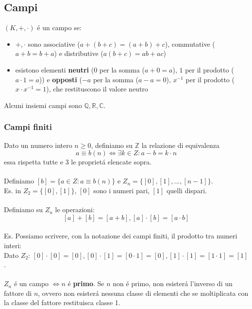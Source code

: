 \documentclass{article}
\begin{document}
\subsection{Campi}
$(K, +, \cdot)$ é un campo se:
\begin{itemize}
	\item[] $+, \cdot$ sono associative ($a+(b+c) = (a+b)+c$), commutative ($a+b=b+a$) e distributive ($a(b+c)=ab+ac$)
	\item[] esistono elementi \textbf{neutri} ($0$ per la somma ($a+0=a$), $1$ per il prodotto ($a \cdot 1 = a$)) e \textbf{opposti} ($-a$ per la somma ($a-a=0$), $x^{-1}$ per il prodotto ($x \cdot x^{-1} = 1$), che restituscono il valore neutro
\end{itemize}
Alcuni insiemi campi sono $\mathbb{Q}, \mathbb{R}, \mathbb{C}$.

\subsubsection{Campi finiti}
Dato un numero intero $n \ge 0$, definiamo su $\mathbb{Z}$ la relazione di equivalenza
$$a \equiv b (n) \iff \exists k \in Z : a - b = k \cdot n$$
essa rispetta tutte e 3 le proprietá elencate sopra. \\\\
Definiamo $[b] = \{a \in Z : a \equiv b (n)\}$ e $Z_n = \{[0], [1], ..., [n-1]\}$. \\
Es. in $Z_2 = \{[0], [1]\}$, $[0]$ sono i numeri pari, $[1]$ quelli dispari. \\\\
Definiamo su $Z_n$ le operazioni:\\
$$[a] + [b] = [a+b], [a] \cdot [b] = [a \cdot b]$$ \\
Es. Possiamo scrivere, con la notazione dei campi finiti, il prodotto tra numeri interi: \\
Dato $Z_2$: $[0] \cdot [0] = [0], [0] \cdot [1] = [0 \cdot 1] = [0], [1] \cdot [1] = [1 \cdot 1] = [1]$. \\\\
$Z_n$ é un campo $\iff n$ é \textbf{primo}. Se $n$ non é primo, non esisterá l'inverso di un fattore di $n$, ovvero non esisterá nessuna classe di elementi che se moltiplicata con la classe del fattore restituisca classe 1.
\end{document}
